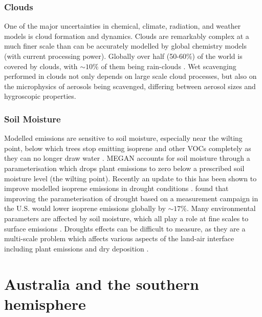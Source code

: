     
    \subsubsection{Clouds}
      \label{LR:Models:Uncert:Clouds}
      One of the major uncertainties in chemical, climate, radiation, and weather models is cloud formation and dynamics.
      Clouds are remarkably complex at a much finer scale than can be accurately modelled by global chemistry models (with current processing power).
      Globally over half (50-60\%) of the world is covered by clouds, with $\sim10\%$ of them being rain-clouds \parencite{Kanakidou2005}.
      Wet scavenging performed in clouds not only depends on large scale cloud processes, but also on the microphysics of aerosols being scavenged, differing between aerosol sizes and hygroscopic properties.
      
      
    
    \subsubsection{Soil Moisture}
      \label{LR:Models:Uncert:SoilMoisture}
      Modelled emissions are sensitive to soil moisture, especially near the wilting point, below which trees stop emitting isoprene and other VOCs completely as they can no longer draw water \parencite{Bauwens2016}.
      MEGAN accounts for soil moisture through a parameterisation which drops plant emissions to zero below a prescribed soil moisture level (the wilting point).
      Recently an update to this has been shown to improve modelled isoprene emissions in drought conditions \parencite{Jiang2018}.
      \textcite{Jiang2018} found that improving the parameterisation of drought based on a measurement campaign in the U.S. would lower isoprene emissions globally by $\sim17\%$.
      Many environmental parameters are affected by soil moisture, which all play a role at fine scales to surface emissions \parencite{Rowntree1983,Chen2001}.
      Droughts effects can be difficult to measure, as they are a multi-scale problem which affects various aspects of the land-air interface including plant emissions and dry deposition \parencite{Wang2017}.
      

\section{Australia and the southern hemisphere}
\label{LR:Aus}
  
